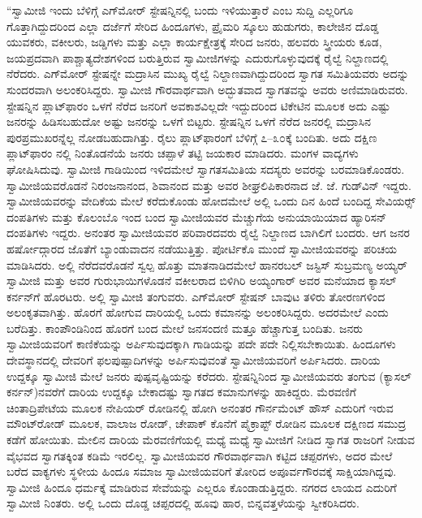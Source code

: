  “ಸ್ವಾಮೀಜಿ ಇಂದು ಬೆಳಿಗ್ಗೆ ಎಗ್‍ಮೋರ್ ಸ್ಟೇಷನ್ನಿನಲ್ಲಿ ಬಂದು ಇಳಿಯುತ್ತಾರೆ ಎಂಬ ಸುದ್ದಿ ಎಲ್ಲರಿಗೂ ಗೊತ್ತಾಗಿದ್ದುದರಿಂದ ಎಲ್ಲಾ ದರ್ಜೆಗೆ ಸೇರಿದ ಹಿಂದೂಗಳು, ಪ್ರೈಮರಿ ಸ್ಕೂಲು ಹುಡುಗರು, ಕಾಲೇಜಿನ ದೊಡ್ಡ ಯುವಕರು, ವಕೀಲರು, ಜಡ್ಡಿಗಳು ಮತ್ತು ಎಲ್ಲಾ ಕಾರ್ಯಕ್ಷೇತ್ರಕ್ಕೆ ಸೇರಿದ ಜನರು, ಹಲವರು ಸ್ತ್ರೀಯರು ಕೂಡ, ಜಯಪ್ರದವಾಗಿ ಪಾಶ್ಚಾತ್ಯದೇಶಗಳಿಂದ ಬರುತ್ತಿರುವ ಸ್ವಾಮೀಜಿಗಳನ್ನು ಎದುರುಗೊಳ್ಳುವುದಕ್ಕೆ ರೈಲ್ವೆ ನಿಲ್ದಾಣದಲ್ಲಿ ನೆರೆದರು. ಎಗ್‍ಮೋರ್ ಸ್ಟೇಷನ್ನೇ ಮದ್ರಾಸಿನ ಮುಖ್ಯ ರೈಲ್ವೆ ನಿಲ್ದಾಣವಾಗಿದ್ದುದರಿಂದ ಸ್ವಾಗತ ಸಮಿತಿಯವರು ಅದನ್ನು ಸುಂದರವಾಗಿ ಅಲಂಕರಿಸಿದ್ದರು. ಸ್ವಾಮೀಜಿ ಗೌರವಾರ್ಥವಾಗಿ ಅದ್ಭುತವಾದ ಸ್ವಾಗತವನ್ನು ಅವರು ಅಣಿಮಾಡಿರುವರು. ಸ್ಟೇಷನ್ನಿನ ಪ್ಲಾಟ್‍ಫಾರಂ ಒಳಗೆ ನೆರೆದ ಜನರಿಗೆ ಅವಕಾಶವಿಲ್ಲದೇ ಇದ್ದುದರಿಂದ ಟಿಕೇಟಿನ ಮೂಲಕ ಅದು ಎಷ್ಟು ಜನರನ್ನು ಹಿಡಿಸಬಹುದೋ ಅಷ್ಟು ಜನರನ್ನು ಒಳಗೆ ಬಿಟ್ಟರು. ಸ್ಟೇಷನ್ನಿನ ಒಳಗೆ ನೆರೆದ ಜನರಲ್ಲಿ ಮದ್ರಾಸಿನ ಪುರಪ್ರಮುಖರನ್ನೆಲ್ಲ ನೋಡಬಹುದಾಗಿತ್ತು. ರೈಲು ಪ್ಲಾಟ್‍ಫಾರಂಗೆ ಬೆಳಿಗ್ಗೆ ೭–೩೦ಕ್ಕೆ ಬಂದಿತು. ಅದು ದಕ್ಷಿಣ ಪ್ಲಾಟ್‍ಫಾರಂ ನಲ್ಲಿ ನಿಂತೊಡನೆಯೆ ಜನರು ಚಪ್ಪಾಳೆ ತಟ್ಟಿ ಜಯಕಾರ ಮಾಡಿದರು. ಮಂಗಳ ವಾದ್ಯಗಳು ಘೋಷಿಸಿದುವು. ಸ್ವಾಮೀಜಿ ಗಾಡಿಯಿಂದ ಇಳಿದಮೇಲೆ ಸ್ವಾಗತಸಮಿತಿಯ ಸದಸ್ಯರು ಅವರನ್ನು ಬರಮಾಡಿಕೊಂಡರು. ಸ್ವಾಮೀಜಿಯವರೊಡನೆ ನಿರಂಜನಾನಂದ, ಶಿವಾನಂದ ಮತ್ತು ಅವರ ಶೀಘ್ರಲಿಪಿಕಾರನಾದ ಜೆ. ಜೆ. ಗುಡ್‍ವಿನ್ ಇದ್ದರು. ಸ್ವಾಮೀಜಿಯವರನ್ನು ವೇದಿಕೆಯ ಮೇಲೆ ಕರೆದುಕೊಂಡು ಹೋದಮೇಲೆ ಅಲ್ಲಿ ಒಂದು ದಿನ ಹಿಂದೆ ಬಂದಿದ್ದ ಸೇವಿಯರ್ಸ್‍‍ ದಂಪತಿಗಳು ಮತ್ತು ಕೊಲಂಬೊ ಇಂದ ಬಂದ ಸ್ವಾಮೀಜಿಯವರ ಮೆಚ್ಚುಗೆಯ ಅನುಯಾಯಿಯಾದ ಹ್ಯಾರಿಸನ್ ದಂಪತಿಗಳು ಇದ್ದರು. ಅನಂತರ ಸ್ವಾಮೀಜಿಯವರ ಪರಿವಾರದವರು ರೈಲ್ವೆ ನಿಲ್ದಾಣದ ಬಾಗಿಲಿಗೆ ಬಂದರು. ಆಗ ಜನರ ಹರ್ಷೋದ್ಗಾರದ ಜೊತೆಗೆ ಬ್ಯಾಂಡುವಾದನ ನಡೆಯುತ್ತಿತ್ತು. ಪೋರ್ಟಿಕೊ ಮುಂದೆ ಸ್ವಾಮೀಜಿಯವರನ್ನು ಪರಿಚಯ ಮಾಡಿಸಿದರು. ಅಲ್ಲಿ ನೆರೆದವರೊಡನೆ ಸ್ವಲ್ಪ ಹೊತ್ತು ಮಾತನಾಡಿದಮೇಲೆ ಹಾನರಬಲ್ ಜಸ್ಟಿಸ್ ಸುಬ್ರಮಣ್ಯ ಅಯ್ಯರ್ ಸ್ವಾಮೀಜಿ ಮತ್ತು ಅವರ ಗುರುಭಾಯಿಗಳೊಡನೆ ವಕೀಲರಾದ ಬಿಳಿಗಿರಿ ಅಯ್ಯಂಗಾರ್ ಅವರ ಮನೆಯಾದ ಕ್ಯಾಸಲ್ ಕರ್ನನ್‍ಗೆ ಹೊರಟರು. ಅಲ್ಲಿ ಸ್ವಾಮೀಜಿ ತಂಗುವರು. ಎಗ್‍ಮೋರ್ ಸ್ಟೇಷನ್ ಬಾವುಟ ತಳಿರು ತೋರಣಗಳಿಂದ ಅಲಂಕೃತವಾಗಿತ್ತು. ಹೊರಗೆ ಹೋಗುವ ದಾರಿಯಲ್ಲಿ ಒಂದು ಕಮಾನನ್ನು ಅಲಂಕರಿಸಿದ್ದರು. ಅದರಮೇಲೆ  ಎಂದು ಬರೆದಿತ್ತು. ಕಾಂಪೌಂಡಿನಿಂದ ಹೊರಗೆ ಬಂದ ಮೇಲೆ ಜನಸಂದಣಿ ಮತ್ತೂ ಹೆಚ್ಚಾಗುತ್ತ ಬಂದಿತು. ಜನರು ಸ್ವಾಮೀಜಿಯವರಿಗೆ ಕಾಣಿಕೆಯನ್ನು ಅರ್ಪಿಸುವುದಕ್ಕಾಗಿ ಗಾಡಿಯನ್ನು ಪದೇ ಪದೇ ನಿಲ್ಲಿಸಬೇಕಾಯಿತು. ಹಿಂದೂಗಳು ದೇವಸ್ಥಾನದಲ್ಲಿ ದೇವರಿಗೆ ಫಲಪುಷ್ಪಾದಿಗಳನ್ನು ಅರ್ಪಿಸುವುವಂತೆ ಸ್ವಾಮೀಜಿಯವರಿಗೆ ಅರ್ಪಿಸಿದರು. ದಾರಿಯ ಉದ್ದಕ್ಕೂ ಸ್ವಾಮೀಜಿ ಮೇಲೆ ಜನರು ಪುಷ್ಪವೃಷ್ಟಿಯನ್ನು ಕರೆದರು. ಸ್ಟೇಷನ್ನಿನಿಂದ ಸ್ವಾಮೀಜಿಯವರು ತಂಗುವ  (ಕ್ಯಾಸಲ್ ಕರ್ನನ್)‌ನವರೆಗೆ ದಾರಿಯ ಉದ್ದಕ್ಕೂ ಬೇಕಾದಷ್ಟು ಸ್ವಾಗತದ ಕಮಾನುಗಳನ್ನು ಹಾಕಿದ್ದರು. ಮೆರವಣಿಗೆ ಚಿಂತಾದ್ರಿಪೇಟೆಯ ಮೂಲಕ ನೇಪಿಯರ್ ರೋಡಿನಲ್ಲಿ ಹೋಗಿ ಅನಂತರ ಗೌರ್ನಮೆಂಟ್ ಹೌಸ್ ಎದುರಿಗೆ ಇರುವ ಮೌಂಟ್‍ರೋಡ್ ಮೂಲಕ, ವಾಲಾಜ ರೋಡ್, ಚೇಪಾಕ್ ಕೊನೆಗೆ ಪೈಕ್ರಾಪ್ಟ್ ರೋಡಿನ ಮೂಲಕ ದಕ್ಷಿಣದ ಸಮುದ್ರ ಕಡೆಗೆ ಹೋಯಿತು. ಮೇಲಿನ ದಾರಿಯ ಮೆರವಣಿಗೆಯಲ್ಲಿ ಮಧ್ಯೆ ಮಧ್ಯೆ ಸ್ವಾಮೀಜಿಗೆ ನೀಡಿದ ಸ್ವಾಗತ ರಾಜರಿಗೆ ನೀಡುವ ವೈಭವದ ಸ್ವಾಗತಕ್ಕಿಂತ ಕಡಿಮೆ ಇರಲಿಲ್ಲ. ಸ್ವಾಮೀಜಿಯವರ ಗೌರವಾರ್ಥವಾಗಿ ಕಟ್ಟಿದ ಚಪ್ಪರಗಳು, ಅದರ ಮೇಲೆ ಬರೆದ ವಾಕ್ಯಗಳು ಸ್ಥಳೀಯ ಹಿಂದೂ ಸಮಾಜ ಸ್ವಾಮೀಜಿಯವರಿಗೆ ತೋರಿದ ಅಪೂರ್ವಗೌರವಕ್ಕೆ ಸಾಕ್ಷಿಯಾಗಿದ್ದವು. ಸ್ವಾಮೀಜಿ ಹಿಂದೂ ಧರ್ಮಕ್ಕೆ ಮಾಡಿರುವ ಸೇವೆಯನ್ನು ಎಲ್ಲರೂ ಕೊಂಡಾಡುತ್ತಿದ್ದರು. ನಗರದ ಲಾಯದ ಎದುರಿಗೆ ಸ್ವಾಮೀಜಿ ನಿಂತರು. ಅಲ್ಲಿ ಒಂದು ದೊಡ್ಡ ಚಪ್ಪರದಲ್ಲಿ ಹೂವು ಹಾರ, ಬಿನ್ನವತ್ತಳೆಯನ್ನು ಸ್ವೀಕರಿಸಿದರು. 

